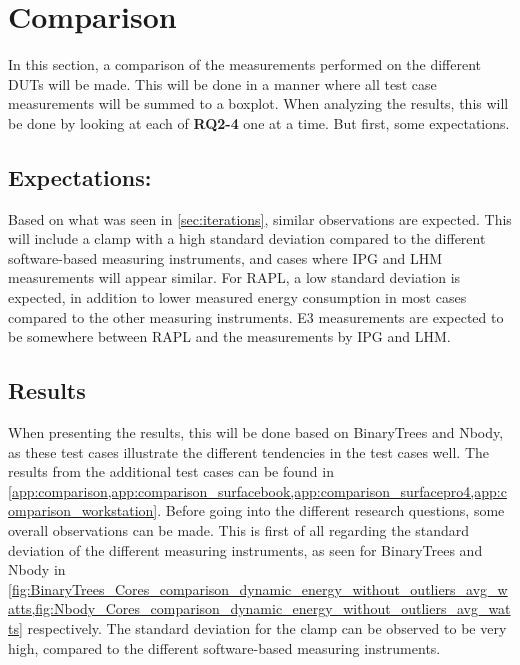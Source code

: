 \section{Comparison}\label{sec:comparison}

In this section, a comparison of the measurements performed on the different DUTs will be made. This will be done in a manner where all test case measurements will be summed to a boxplot. When analyzing the results, this will be done by looking at each of \textbf{RQ2-4} one at a time. But first, some expectations.


\subsection{Expectations:} 

Based on what was seen in \cref{sec:iterations}, similar observations are expected. This will include a clamp with a high standard deviation compared to the different software-based measuring instruments, and cases where IPG and LHM measurements will appear similar. For RAPL, a low standard deviation is expected, in addition to lower measured energy consumption in most cases compared to the other measuring instruments. E3 measurements are expected to be somewhere between RAPL and the measurements by IPG and LHM.


\subsection{Results}

When presenting the results, this will be done based on BinaryTrees and Nbody, as these test cases illustrate the different tendencies in the test cases well. The results from the additional test cases can be found in \cref{app:comparison,app:comparison_surfacebook,app:comparison_surfacepro4,app:comparison_workstation}. Before going into the different research questions, some overall observations can be made. This is first of all regarding the standard deviation of the different measuring instruments, as seen for BinaryTrees and Nbody in \cref{fig:BinaryTrees_Cores_comparison_dynamic_energy_without_outliers_avg_watts,fig:Nbody_Cores_comparison_dynamic_energy_without_outliers_avg_watts} respectively. The standard deviation for the clamp can be observed to be very high, compared to the different software-based measuring instruments.






